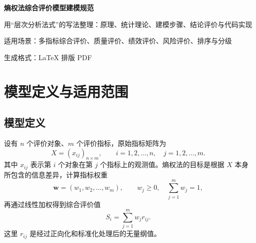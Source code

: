 \documentclass[UTF8,zihao=-4]{ctexart}
\begin{document}
\begin{titlepage}
  \centering
  \vspace*{1.2cm}
  {\Huge\bfseries\color{mainblue} 熵权法综合评价模型建模规范\par}
  \vspace{0.5cm}
  {\Large 用“层次分析法式”的写法整理：原理、统计理论、建模步骤、结论评价与代码实现\par}
  \vspace{1.2cm}
  \vfill
  {\large 适用场景：多指标综合评价、质量评价、绩效评价、风险评价、排序与分级\par}
  \vspace{0.6cm}
  {\large 生成格式：\LaTeX{} 排版 PDF\par}
  \vspace{1.2cm}
\end{titlepage}

\tableofcontents
\newpage

\begin{abstract}
熵权法是一类典型的客观赋权方法。它不直接询问专家“某指标有多重要”，而是观察样本数据中各指标的差异程度：若某指标在不同评价对象之间差异明显，则该指标更能区分评价对象，信息效用较大，权重应较高；若某指标几乎所有对象都差不多，则其区分能力弱，权重应较低。本文按照“层次分析法建模说明”的写法，将熵权法整理为一套可复用的建模规范，包括：理论依据、指标体系设计、正向化、标准化、信息熵与熵权计算、综合评价指数、评价等级、结果解释、常见问题、网络扩展思路与 Python 代码。文中示例参考了航行通告数据质量评价研究中“完整性、及时性、准确性、规范性、有效性”等指标体系，并补充为通用建模模板\cite{li2022notam}。
\end{abstract}

\section{模型定义与适用范围}

\subsection{模型定义}
设有 $n$ 个评价对象、$m$ 个评价指标，原始指标矩阵为
\begin{equation}
X=(x_{ij})_{n\times m},\qquad i=1,2,\dots,n,\quad j=1,2,\dots,m.
\end{equation}
其中 $x_{ij}$ 表示第 $i$ 个对象在第 $j$ 个指标上的观测值。熵权法的目标是根据 $X$ 本身所包含的信息差异，计算指标权重
\begin{equation}
\bm{w}=(w_1,w_2,\dots,w_m),\qquad w_j\ge 0,\quad \sum_{j=1}^m w_j=1,
\end{equation}
再通过线性加权得到综合评价值
\begin{equation}
S_i=\sum_{j=1}^{m}w_j r_{ij}.
\end{equation}
这里 $r_{ij}$ 是经过正向化和标准化处理后的无量纲值。
\end{document}
